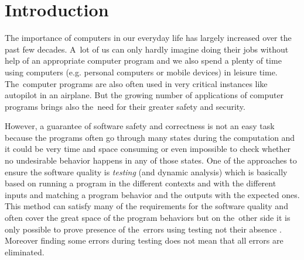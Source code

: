 \documentclass[fleqn,11pt]{ExcelAtFIT} %
\affiliation{*%
  \href{mailto:xhrusk16@stud.fit.vutbr.cz}{xhrusk16@stud.fit.vutbr.cz},
  \textit{Faculty of Information Technology, Brno University of Technology}}
\begin{document}
\startdocument



\section{Introduction}

The importance of computers in our everyday life has largely increased over the past few decades.
A~lot of us can only hardly imagine doing their jobs without help of an appropriate computer program
and we also spend a plenty of time using computers (e.g. personal computers or mobile devices) in leisure time.
The~computer programs are also often used in very critical instances like autopilot in an airplane.
But the growing number of applications of computer programs brings also the~need for their greater safety and security.

However, a guarantee of software safety and correctness is not an easy task
because the programs often go through many states during the computation
and it could be very time and space consuming or even impossible to check whether no undesirable behavior
happens in any of those states.
One of the approaches to ensure the software quality is \emph{testing} (and dynamic analysis) which is basically based
on running a program in the different contexts and with the different inputs
and matching a program behavior and the outputs with the expected ones.
This method can satisfy many of the requirements for the software quality and often cover the great space of the program behaviors
but on the~other side it is only possible to prove presence of the~errors using testing not their absence \cite{dijkstra}.
Moreover finding some errors during testing does not mean that all errors are eliminated.
\end{document}
